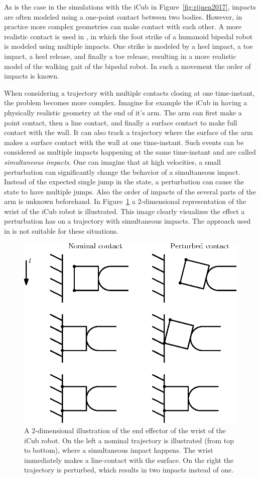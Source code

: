 \documentclass[../DC2017114Bouma.tex]{subfiles}
\begin{document}
As is the case in the simulations with the iCub in Figure~\ref{fig:rijnen2017}, impacts are often modeled using a one-point contact between two bodies. However, in practice more complex geometries can make contact with each other. A more realistic contact is used in \cite{Zhao2015}, in which the foot strike of a humanoid bipedal robot is modeled using multiple impacts. One strike is modeled by a heel impact, a toe impact, a heel release, and finally a toe release, resulting in a more realistic model of the walking gait of the bipedal robot. In such a movement the order of impacts is known.

When considering a trajectory with multiple contacts closing at one time-instant, the problem becomes more complex. Imagine for example the iCub in \cite{Rijnen2017a} having a physically realistic geometry at the end of it's arm. The arm can first make a point contact, then a line contact, and finally a surface contact to make full contact with the wall. It can also track a trajectory where the surface of the arm makes a surface contact with the wall at one time-instant. Such events can be considered as multiple impacts happening at the same time-instant and are called \textit{simultaneous impacts}. One can imagine that at high velocities, a small perturbation can significantly change the behavior of a simultaneous impact. Instead of the expected single jump in the state, a perturbation can cause the state to have multiple jumps. Also the order of impacts of the several parts of the arm is unknown beforehand. In Figure~\ref{fig:simultaneous} a 2-dimensional representation of the wrist of the iCub robot is illustrated. This image clearly visualizes the effect a perturbation has on a trajectory with simultaneous impacts. The approach used in \cite{Zhao2015} is not suitable for these situations.

\begin{figure}[H]
\centering
\includegraphics[width=.45\textwidth]{simultaneous.eps}\caption{A 2-dimensional illustration of the end effector of the wrist of the iCub robot. On the left a nominal trajectory is illustrated (from top to bottom), where a simultaneous impact happens. The wrist immediately makes a line-contact with the surface. On the right the trajectory is perturbed, which results in two impacts instead of one.}\label{fig:simultaneous}
\end{figure}
\end{document}
